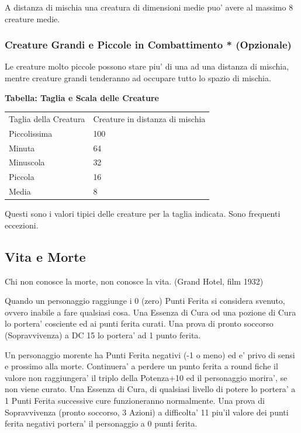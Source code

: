 \documentclass[a4paper,11pt,twoside,openany]{dndbook}
\begin{document}
A distanza di mischia una creatura di dimensioni medie puo' avere al massimo 8 creature medie.


\subsubsection{Creature Grandi e Piccole in Combattimento {*} (Opzionale)}

\label{creature-grandi-e-piccole-in-combattimento-opzionale}

Le creature molto piccole possono stare piu' di una ad una distanza
di mischia, mentre creature grandi tenderanno ad occupare tutto lo
spazio di mischia.

\textbf{Tabella: Taglia e Scala delle Creature}
\bigskip

\begin{tabular}[c]{@{}ll@{}}
	\toprule 
	Taglia della Creatura & Creature in distanza di mischia\tabularnewline
	Piccolissima & 100\tabularnewline
	Minuta & 64\tabularnewline
	Minuscola & 32\tabularnewline
	Piccola & 16\tabularnewline
	Media & 8\tabularnewline
	\bottomrule
\end{tabular}

\smallskip
Questi sono i valori tipici delle creature per la taglia indicata.
Sono frequenti eccezioni.
\bigskip

\pagebreak

\subsection{Vita e Morte}

\label{vita-e-morte}
\begin{quotebox}Chi non conosce la morte, non conosce la vita. (Grand Hotel, film 1932)
\end{quotebox}

Quando un personaggio raggiunge i 0 (zero) Punti Ferita si considera svenuto, ovvero inabile a fare qualsiasi cosa. Una Essenza di Cura od una pozione di Cura lo portera’ cosciente ed ai punti ferita curati. Una prova di pronto soccorso (Sopravvivenza) a DC 15 lo portera’ ad 1 punto ferita.

Un personaggio morente ha Punti Ferita negativi (-1 o meno) ed e' privo di sensi e prossimo alla morte. Continuera’ a perdere un punto ferita a round fiche il valore non raggiungera’ il triplo della Potenza+10 ed il personaggio morira’, se non viene curato.
Una Essenza di Cura, di qualsiasi livello di potere lo portera’ a 1 Punti Ferita successive cure funzioneranno normalmente.
Una prova di Sopravvivenza (pronto soccorso, 3 Azioni) a difficolta’ 11 piu’il valore dei punti ferita negativi portera’ il personaggio a 0 punti ferita.
\end{document}
